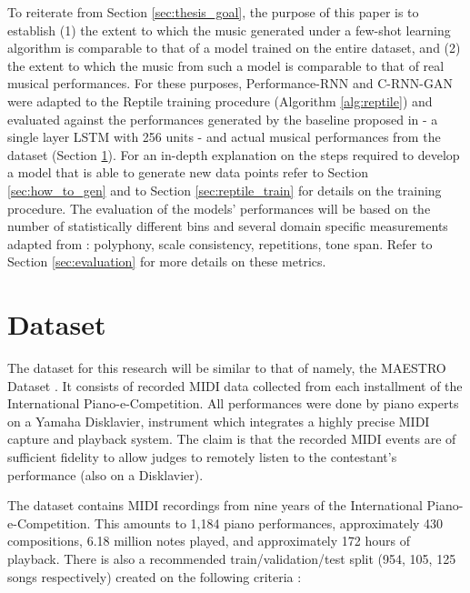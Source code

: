 \documentclass[a4paper]{book}
\begin{document}
To reiterate from Section \ref{sec:thesis_goal}, the purpose of this paper is to establish (1) the extent to which the music generated under a few-shot learning algorithm is comparable to that of a model trained on the entire dataset, and (2) the extent to which the music from such a model is comparable to that of real musical performances. For these purposes, Performance-RNN and C-RNN-GAN were adapted to the Reptile training procedure (Algorithm \ref{alg:reptile}) and evaluated against the performances generated by the baseline proposed in \textcite{larochelle_few-shot_2017} - a single layer LSTM with 256 units - and actual musical performances from the dataset (Section \ref{sec:dataset}). For an in-depth explanation on the steps required to develop a model that is able to generate new data points refer to Section \ref{sec:how_to_gen} and to Section \ref{sec:reptile_train} for details on the training procedure. The evaluation of the models' performances will be based on the number of statistically different bins \parencite[NDB;][]{richardson_gans_2018} and several domain specific measurements adapted from \textcite{mogren_c-rnn-gan_2016}: polyphony, scale consistency, repetitions, tone span. Refer to Section \ref{sec:evaluation} for more details on these metrics.

\section{Dataset} \label{sec:dataset}

The dataset for this research will be similar to that of \parencite{oore_this_2018} namely, the MAESTRO Dataset \parencite{hawthorne_enabling_2018}. It consists of recorded MIDI data collected from each installment of the International Piano-e-Competition. All performances were done by piano experts on a Yamaha Disklavier, instrument which integrates a highly precise MIDI capture and playback system. The claim is that the recorded MIDI events are of sufficient fidelity to allow judges to remotely listen to the contestant's performance (also on a Disklavier).

The dataset contains MIDI recordings from nine years of the International Piano-e-Competition. This amounts to 1,184 piano performances, approximately 430 compositions, 6.18 million notes played, and approximately 172 hours of playback. There is also a recommended train/validation/test split (954, 105, 125 songs respectively) created on the following criteria \parencite{hawthorne_enabling_2018}:
\end{document}
